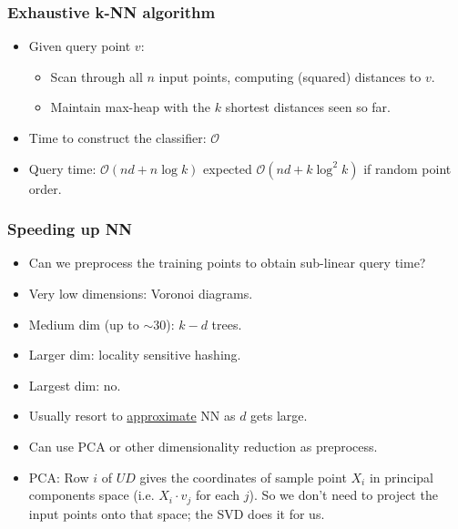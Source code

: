 \documentclass[10pt]{article}
\newcommand{\bigo}{\mathcal{O}}
\begin{document}
\subsubsection*{Exhaustive k-NN algorithm}
\begin{itemize}
	\item Given query point $v$:
		\begin{itemize}
			\item Scan through all $n$ input points, computing (squared) distances to $v$.
			\item Maintain max-heap with the $k$ shortest distances seen so far.
		\end{itemize}
	\item Time to construct the classifier: $\bigo$
	\item Query time: $\bigo(nd + n\log k)$ expected $\bigo(nd + k\log^{2} k)$ if random point order. 
\end{itemize}

\subsubsection*{Speeding up NN}
\begin{itemize}
	\item Can we preprocess the training points to obtain sub-linear query time?
	\item Very low dimensions: Voronoi diagrams.
	\item Medium dim (up to $\sim 30$): $k-d$ trees.
	\item Larger dim: locality sensitive hashing.
	\item Largest dim: no.
	\item Usually resort to \underline{approximate} NN as $d$ gets large.
	\item Can use PCA or other dimensionality reduction as preprocess.
	\item PCA: Row $i$ of $UD$ gives the coordinates of sample point $X_{i}$ in principal components space (i.e. $X_{i}\cdot v_{j}$ for each $j$). So we don't need to project the input points onto that space; the SVD does it for us.
\end{itemize}
\end{document}
